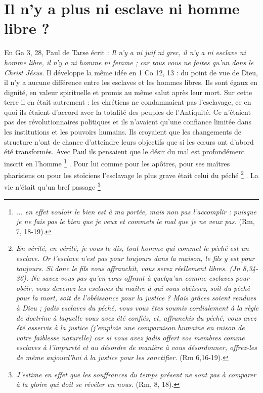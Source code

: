 \section{Il n'y a plus ni esclave ni homme libre ?}


 
 
 En Ga 3, 28, Paul de Tarse écrit : \emph{Il n'y a ni juif ni grec, il n'y a ni esclave ni homme libre, il n'y a ni homme ni femme ; car tous vous ne faites qu'un dans le Christ Jésus}. Il développe la même idée en 1 Co 12, 13 : du point de vue de Dieu, il n'y a aucune différence entre les esclaves et les hommes libres. Ils sont égaux en dignité, en valeur spirituelle et promis au même salut après leur mort. Sur cette terre il en était autrement : les chrétiens ne condamnaient pas l'esclavage, ce en quoi ils étaient d'accord avec la totalité des peuples de l'Antiquité. Ce n'étaient pas des révolutionnaires politiques et ils n'avaient qu'une confiance limitée dans les institutions et les pouvoirs humains. Ils croyaient que les changements de structure n'ont de chance d'atteindre leurs objectifs que si les cœurs ont d'abord été transformés. Avec Paul ils pensaient que le désir du mal est profondément inscrit en l'homme
\footnote{\emph{... en effet vouloir le bien est à ma portée, mais non pas l'accomplir : puisque je ne fais pas le bien que je veux et commets le mal que je ne veux pas.} (Rm, 7, 18-19).}
. Pour lui comme pour les apôtres, pour ses maîtres pharisiens ou pour les stoïciens l'esclavage le plus grave était celui du péché%
\footnote{\emph{En vérité, en vérité, je vous le dis, tout homme qui commet le péché est un esclave. Or l'esclave n'est pas pour toujours dans la maison, le fils y est pour toujours. Si donc le fils vous affranchit, vous serez réellement libres. \emph{(Jn 8,34-36).} Ne savez-vous pas qu'en vous offrant à quelqu'un comme esclaves pour obéir, vous devenez les esclaves du maître à qui vous obéissez, soit du péché pour la mort, soit de l'obéissance pour la justice ? Mais grâces soient rendues à Dieu ; jadis esclaves du péché, vous vous êtes soumis cordialement à la règle de doctrine à laquelle vous avez été confiés, et, affranchis du péché, vous avez été asservis à la justice (j'emploie une comparaison humaine en raison de votre faiblesse naturelle) car si vous avez jadis offert vos membres comme esclaves à l'impureté et au désordre de manière à vous désordonner, offrez-les de même aujourd'hui à la justice pour les sanctifier.} (Rm 6,16-19).}
. La vie n'était qu'un bref passage
\footnote{\emph{J'estime en effet que les souffrances du temps présent ne sont pas à comparer à la gloire qui doit se révéler en nous.} (Rm, 8, 18).}%
